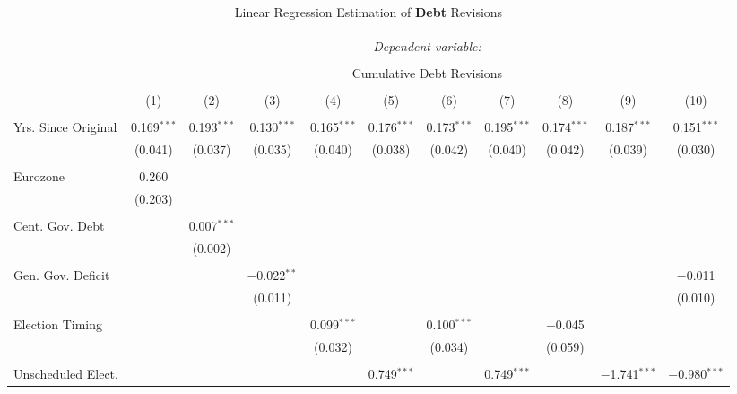 
\begin{table}[!htbp] \centering 
  \caption{Linear Regression Estimation of \textbf{Debt} Revisions} 
  \label{debt_results} 
\tiny 
\begin{tabular}{@{\extracolsep{5pt}}lcccccccccc} 
\\[-1.8ex]\hline 
\hline \\[-1.8ex] 
 & \multicolumn{10}{c}{\textit{Dependent variable:}} \\ 
\cline{2-11} 
\\[-1.8ex] & \multicolumn{10}{c}{Cumulative Debt Revisions} \\ 
\\[-1.8ex] & (1) & (2) & (3) & (4) & (5) & (6) & (7) & (8) & (9) & (10)\\ 
\hline \\[-1.8ex] 
 Yrs. Since Original & 0.169$^{***}$ & 0.193$^{***}$ & 0.130$^{***}$ & 0.165$^{***}$ & 0.176$^{***}$ & 0.173$^{***}$ & 0.195$^{***}$ & 0.174$^{***}$ & 0.187$^{***}$ & 0.151$^{***}$ \\ 
  & (0.041) & (0.037) & (0.035) & (0.040) & (0.038) & (0.042) & (0.040) & (0.042) & (0.039) & (0.030) \\ 
  & & & & & & & & & & \\ 
 Eurozone & 0.260 &  &  &  &  &  &  &  &  &  \\ 
  & (0.203) &  &  &  &  &  &  &  &  &  \\ 
  & & & & & & & & & & \\ 
 Cent. Gov. Debt &  & 0.007$^{***}$ &  &  &  &  &  &  &  &  \\ 
  &  & (0.002) &  &  &  &  &  &  &  &  \\ 
  & & & & & & & & & & \\ 
 Gen. Gov. Deficit &  &  & $-$0.022$^{**}$ &  &  &  &  &  &  & $-$0.011 \\ 
  &  &  & (0.011) &  &  &  &  &  &  & (0.010) \\ 
  & & & & & & & & & & \\ 
 Election Timing &  &  &  & 0.099$^{***}$ &  & 0.100$^{***}$ &  & $-$0.045 &  &  \\ 
  &  &  &  & (0.032) &  & (0.034) &  & (0.059) &  &  \\ 
  & & & & & & & & & & \\ 
 Unscheduled Elect. &  &  &  &  & 0.749$^{***}$ &  & 0.749$^{***}$ &  & $-$1.741$^{***}$ & $-$0.980$^{***}$ \\ 

\end{tabular}
\end{table}
